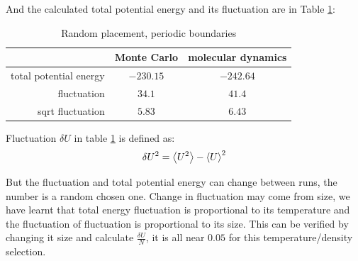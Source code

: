 \documentclass[UTF8,a4paper]{article}
\begin{document}
And the calculated total potential energy and its fluctuation are in Table \ref{tab:rand1}:
\begin{table}[H]
	\centering
	\caption{Random placement, periodic boundaries}
	\begin{tabular}{rcc}
		\toprule
		\toprule
		                       & Monte Carlo & molecular dynamics \\ \midrule
		total potential energy & $-230.15$   & $-242.64$          \\
		fluctuation            & $34.1$      & $41.4$             \\
		sqrt fluctuation       & $5.83$      & $6.43$             \\
		\bottomrule
	\end{tabular}%
	\label{tab:rand1}%
\end{table}%
Fluctuation $\delta U$ in table \ref{tab:rand1} is defined as:
\begin{equation}
	\delta U^{2}=\expval{U^2} - \expval{U}^2	\label{eq:flu}
\end{equation}

But the fluctuation and total potential energy can change between runs, the number is a random chosen one. Change in fluctuation may come from size,
we have learnt that total energy fluctuation is proportional to its temperature and the fluctuation of fluctuation is proportional to its size.
This can be verified by changing it size and calculate $\frac{\delta U}{N}$,
it is all near $0.05$ for this temperature/density selection.
\end{document}
